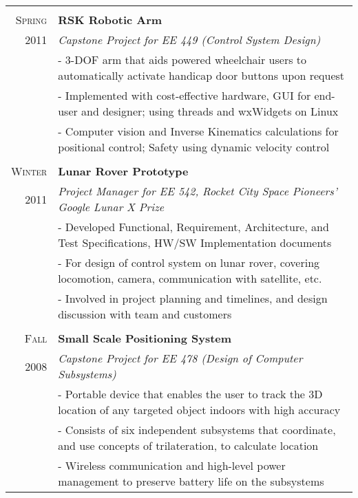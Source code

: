 \documentclass[letter,10pt]{article}
\begin{document}
\begin{tabular}{r|p{16cm}}
\multicolumn{2}{c}{} \\

\textsc{Spring} & \textbf{RSK Robotic Arm}\\
\textsc{2011}&\emph{Capstone Project for EE 449 (Control System Design)}\\
&\footnotesize{
 - 3-DOF arm that aids powered wheelchair users to automatically activate handicap door buttons upon request
}\\
&\footnotesize{
 - Implemented with cost-effective hardware, GUI for end-user and designer; using threads and wxWidgets on Linux
}\\
&\footnotesize{
 - Computer vision and Inverse Kinematics calculations for positional control; Safety using dynamic velocity control
}\\

\multicolumn{2}{c}{} \\

\textsc{Winter} & \textbf{Lunar Rover Prototype}\\
\textsc{2011}&\emph{Project Manager for EE 542, Rocket City Space Pioneers' Google Lunar X Prize}\\
&\footnotesize{
 - Developed Functional, Requirement, Architecture, and Test Specifications, HW/SW Implementation documents
}\\
&\footnotesize{
 - For design of control system on lunar rover, covering locomotion, camera, communication with satellite, etc.
}\\
&\footnotesize{
 - Involved in project planning and timelines, and design discussion with team and customers
}\\
\multicolumn{2}{c}{} \\


\textsc{Fall} & \textbf{Small Scale Positioning System}\\
\textsc{2008} &\emph{Capstone Project for EE 478 (Design of Computer Subsystems)}\\
&\footnotesize{
 - Portable device that enables the user to track the 3D location of any targeted object indoors with high accuracy
}\\
&\footnotesize{
 - Consists of six independent subsystems that coordinate, and use concepts of trilateration, to calculate location
}\\
&\footnotesize{
 - Wireless communication and high-level power management to preserve battery life on the subsystems
}\\

\end{tabular}
\end{document}
